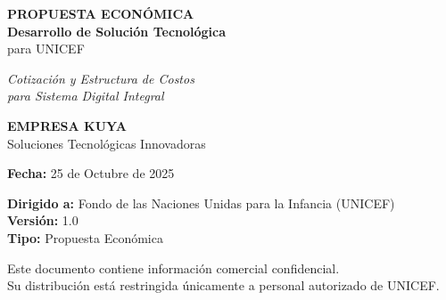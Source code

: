 \begin{titlepage}
    \centering
    
    \vspace{2cm}
    
    {\Huge\bfseries PROPUESTA ECONÓMICA\\[0.5cm]}
    {\Large\bfseries Desarrollo de Solución Tecnológica\\[0.3cm]}
    {\Large para UNICEF\\[2cm]}
    
    {\large\textit{Cotización y Estructura de Costos\\
    para Sistema Digital Integral}\\[3cm]}
    
    {\Large\bfseries EMPRESA KUYA\\[0.5cm]}
    {\large Soluciones Tecnológicas Innovadoras\\[2cm]}
    
    {\large\textbf{Fecha:} 25 de Octubre de 2025\\[1cm]}
    
    {\normalsize
    \textbf{Dirigido a:} Fondo de las Naciones Unidas para la Infancia (UNICEF)\\[0.3cm]
    \textbf{Versión:} 1.0\\[0.3cm]
    \textbf{Tipo:} Propuesta Económica\\
    }
    
    \vfill
    
    {\footnotesize
    Este documento contiene información comercial confidencial.\\
    Su distribución está restringida únicamente a personal autorizado de UNICEF.
    }
    
\end{titlepage}

\newpage
\thispagestyle{empty}
\mbox{}
\newpage